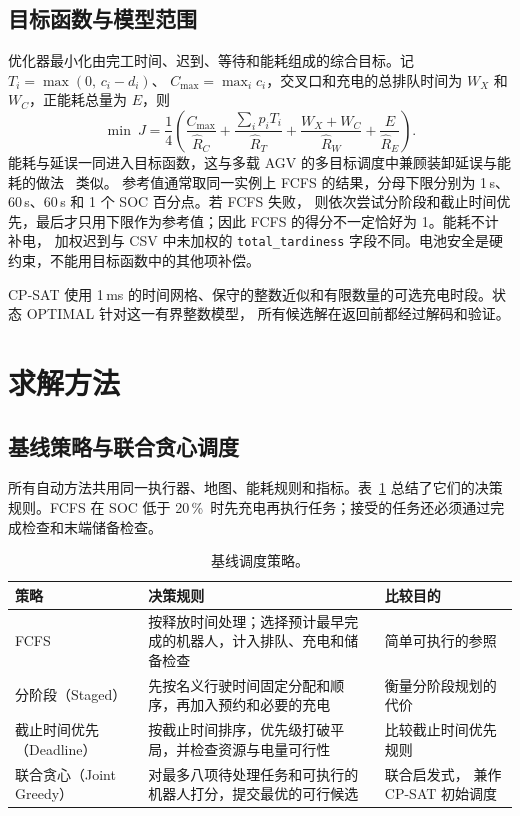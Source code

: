 \documentclass[11pt,a4paper,fontset=none]{ctexart}
\newcommand{\code}[1]{\texttt{#1}}
\newcommand{\pct}{\,\%}
\begin{document}
\subsection{目标函数与模型范围}

优化器最小化由完工时间、迟到、等待和能耗组成的综合目标。记 $T_i = \max(0,\, c_i - d_i)$、
$C_{\max} = \max_i c_i$，交叉口和充电的总排队时间为 $W_X$ 和 $W_C$，正能耗总量为 $E$，则
\begin{equation}
\min\ J = \frac{1}{4}\left( \frac{C_{\max}}{\hat R_C} + \frac{\sum_i p_i T_i}{\hat R_T}
  + \frac{W_X + W_C}{\hat R_W} + \frac{E}{\hat R_E} \right).
\label{eq:J}
\end{equation}
能耗与延误一同进入目标函数，这与多载 AGV 的多目标调度中兼顾装卸延误与能耗的做法~\cite{huo2024multiload} 类似。
参考值通常取同一实例上 FCFS 的结果，分母下限分别为 1\,s、60\,s、60\,s 和 1 个 SOC 百分点。若 FCFS 失败，
则依次尝试分阶段和截止时间优先，最后才只用下限作为参考值；因此 FCFS 的得分不一定恰好为 1。能耗不计补电，
加权迟到与 CSV 中未加权的 \code{total\_tardiness} 字段不同。电池安全是硬约束，不能用目标函数中的其他项补偿。

CP-SAT 使用 1\,ms 的时间网格、保守的整数近似和有限数量的可选充电时段。状态 OPTIMAL 针对这一有界整数模型，
所有候选解在返回前都经过解码和验证。

\section{求解方法}
\label{sec:methods}

\subsection{基线策略与联合贪心调度}

所有自动方法共用同一执行器、地图、能耗规则和指标。表~\ref{tab:policies} 总结了它们的决策规则。FCFS 在
SOC 低于 20\pct\ 时先充电再执行任务；接受的任务还必须通过完成检查和末端储备检查。

\begin{table}[!htbp]
\centering\small
\caption{基线调度策略。}
\label{tab:policies}
\begin{tabularx}{\linewidth}{lXX}
\toprule
策略 & 决策规则 & 比较目的 \\
\midrule
FCFS & 按释放时间处理；选择预计最早完成的机器人，计入排队、充电和储备检查 & 简单可执行的参照 \\
分阶段（Staged） & 先按名义行驶时间固定分配和顺序，再加入预约和必要的充电 & 衡量分阶段规划的代价 \\
截止时间优先（Deadline） & 按截止时间排序，优先级打破平局，并检查资源与电量可行性 & 比较截止时间优先规则 \\
联合贪心（Joint Greedy） & 对最多八项待处理任务和可执行的机器人打分，提交最优的可行候选 & 联合启发式，
  兼作 CP-SAT 初始调度 \\
\bottomrule
\end{tabularx}
\end{table}
\end{document}
